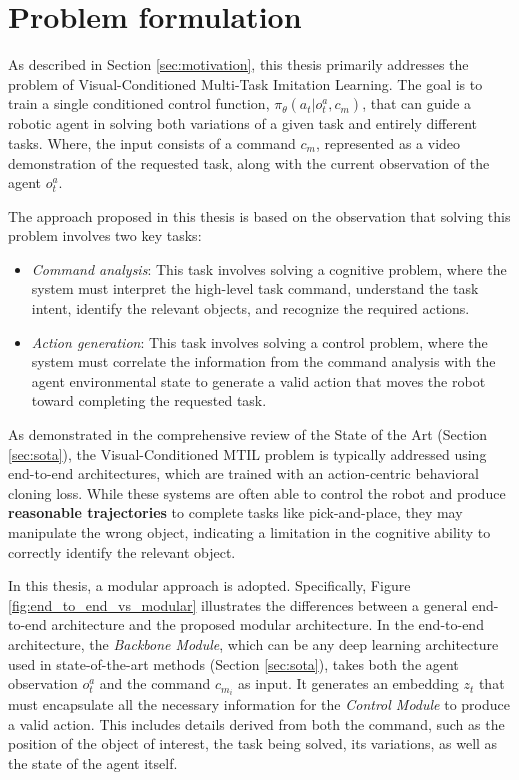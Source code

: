 \section{Problem formulation}
\label{sec:ocpl_problem}
As described in Section \ref{sec:motivation}, this thesis primarily addresses the problem of Visual-Conditioned Multi-Task Imitation Learning. The goal is to train a single conditioned control function, $\pi_{\theta}(a_{t}| o^{a}_{t}, c_m)$, that can guide a robotic agent in solving both variations of a given task and entirely different tasks. Where, the input consists of a command $c_m$, represented as a video demonstration of the requested task, along with the current observation of the agent $o^{a}_{t}$.

The approach proposed in this thesis is based on the observation that solving this problem involves two key tasks:
\begin{itemize}
    \item \textit{Command analysis}: This task involves solving a cognitive problem, where the system must interpret the high-level task command, understand the task intent, identify the relevant objects, and recognize the required actions.
    \item \textit{Action generation}: This task involves solving a control problem, where the system must correlate the information from the command analysis with the agent environmental state to generate a valid action that moves the robot toward completing the requested task.
\end{itemize}

As demonstrated in the comprehensive review of the State of the Art (Section \ref{sec:sota}), the Visual-Conditioned MTIL problem is typically addressed using end-to-end architectures, which are trained with an action-centric behavioral cloning loss. While these systems are often able to control the robot and produce \textbf{reasonable trajectories} to complete tasks like pick-and-place, they may manipulate the wrong object, indicating a limitation in the cognitive ability to correctly identify the relevant object.


In this thesis, a modular approach is adopted. Specifically, Figure \ref{fig:end_to_end_vs_modular} illustrates the differences between a general end-to-end architecture and the proposed modular architecture. In the end-to-end architecture, the \textit{Backbone Module}, which can be any deep learning architecture used in state-of-the-art methods (Section \ref{sec:sota}), takes both the agent observation $o^{a}_t$ and the command $c_{m_i}$ as input. It generates an embedding $z_t$ that must encapsulate all the necessary information for the \textit{Control Module} to produce a valid action. This includes details derived from both the command, such as the position of the object of interest, the task being solved, its variations, as well as the state of the agent itself.

